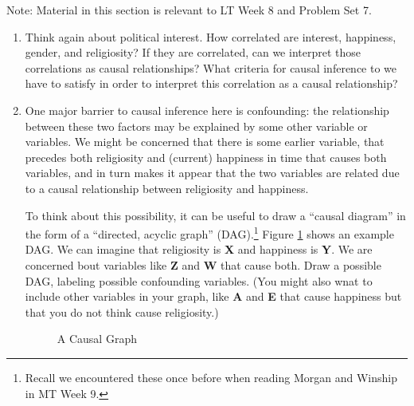 \documentclass[a4paper,12pt]{article}
\begin{document}
Note: Material in this section is relevant to LT Week 8 and Problem Set 7.

\begin{enumerate}

\item Think again about political interest. How correlated are interest, happiness, gender, and religiosity? If they are correlated, can we interpret those correlations as causal relationships? What criteria for causal inference to we have to satisfy in order to interpret this correlation as a causal relationship?

\item One major barrier to causal inference here is confounding: the relationship between these two factors may be explained by some other variable or variables. We might be concerned that there is some earlier variable, that precedes both religiosity and (current) happiness in time that causes both variables, and in turn makes it appear that the two variables are related due to a causal relationship between religiosity and happiness.

To think about this possibility, it can be useful to draw a ``causal diagram'' in the form of a ``directed, acyclic graph'' (DAG).\footnote{Recall we encountered these once before when reading Morgan and Winship in MT Week 9.} Figure \ref{fig:causalgraph} shows an example DAG. We can imagine that religiosity is \textbf{X} and happiness is \textbf{Y}. We are concerned bout variables like \textbf{Z} and \textbf{W} that cause both. Draw a possible DAG, labeling possible confounding variables. (You might also wnat to include other variables in your graph, like \textbf{A} and \textbf{E} that cause happiness but that you do not think cause religiosity.)

\begin{figure}
\centering
{}
\caption{A Causal Graph}\label{fig:causalgraph}
\end{figure}



\end{enumerate}
\end{document}
